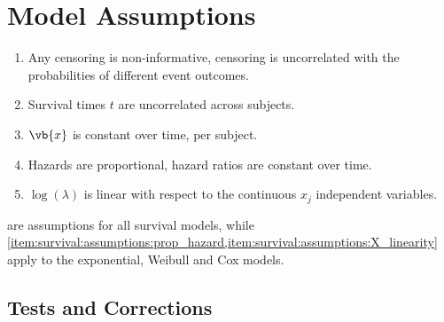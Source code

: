 \section{Model Assumptions}
\label{survival:assumptions}

\begin{enumerate}[noitemsep]
  \item Any censoring is non-informative, \ie censoring is uncorrelated with the probabilities of different event outcomes.\label{item:survival:assumptions:censoring}
  \item Survival times $t$ are uncorrelated across subjects.\label{item:survival:assumptions:t_uncorr}
  \item $\vb{x}$ is constant over time, per subject.\label{item:survival:assumptions:X_constant}
  \item Hazards are proportional, \ie hazard ratios are constant over time.\label{item:survival:assumptions:prop_hazard}
  \item $\log\left(\lambda\right)$ is linear with respect to the continuous $x_{j}$ independent variables.\label{item:survival:assumptions:X_linearity}
\end{enumerate}

are assumptions for all survival models, while
\cref{item:survival:assumptions:prop_hazard,item:survival:assumptions:X_linearity}
apply to the exponential, Weibull and Cox models.

\subsection{Tests and Corrections}
\label{survival:assumptions:tests_and_corrections}

